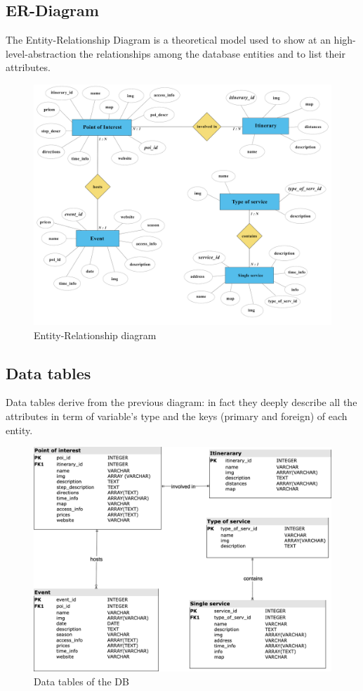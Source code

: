 \documentclass[table, 12pt]{article}
\begin{document}
\subsection{ER-Diagram}
The Entity-Relationship Diagram is a theoretical model used to show at an high-level-abstraction the relationships among the database entities and to list their attributes.
\begin{figure}[H]
    \begin{center}
        \includegraphics[width=\textwidth]{assets/Tables/ER-Diagram.png}
        \caption{Entity-Relationship diagram}
    \end{center}
\end{figure}
\subsection{Data tables}
Data tables derive from the previous diagram: in fact they deeply describe all the attributes in term of variable's type and the keys (primary and foreign) of each entity.
\begin{figure}[H]
    \begin{center}
        \includegraphics[width=\textwidth]{assets/Tables/dataTables.png}
        \caption{Data tables of the DB}
    \end{center}
\end{figure}
\end{document}
